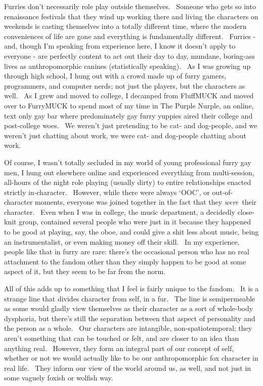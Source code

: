 Furries don't necessarily role play outside themselves. ~Someone who
gets so into renaissance festivals that they wind up working there and
living the characters on weekends is casting themselves into a totally
different time, where the modern conveniences of life are gone and
everything is fundamentally different. ~Furries - and, though I'm
speaking from experience here, I know it doesn't apply to everyone - are
perfectly content to act out their day to day, mundane, boring-ass lives
as anthropomorphic canines (statistically speaking). ~As I was growing
up through high school, I hung out with a crowd made up of furry gamers,
programmers, and computer nerds; not just the players, but the
characters as well. ~As I grew and moved to college, I decamped from
FluffMUCK and moved over to FurryMUCK to spend most of my time in The
Purple Nurple, an online, text only gay bar where predominately gay
furry yuppies aired their college and post-college woes. ~We weren't
just pretending to be cat- and dog-people, and we weren't just chatting
about work, we were cat- and dog-people chatting about work.

Of course, I wasn't totally secluded in my world of young professional
furry gay men, I hung out elsewhere online and experienced everything
from multi-session, all-hours of the night role playing (usually dirty)
to entire relationships enacted strictly in-character. ~However, while
there were always `OOC', or out-of-character moments, everyone was
joined together in the fact that they \emph{were}~their character. ~Even
when I was in college, the music department, a decidedly close-knit
group, contained several people who were just in it because they
happened to be good at playing, say, the oboe, and could give a shit
less about music, being an instrumentalist, or even making money off
their skill. ~In my experience, people like that in furry are rare:
there's the occasional person who has no real attachment to the fandom
other than they simply happen to be good at some aspect of it, but they
seem to be far from the norm.

All of this adds up to something that I feel is fairly unique to the
fandom. ~It is a strange line that divides character from self, in a
fur. ~The line is semipermeable as some would gladly view themselves as
their character as a sort of whole-body dysphoria, but there's still the
separation between that aspect of personality and the person as a whole.
~Our characters are intangible, non-spatiotemporal; they aren't
something that can be touched or felt, and are closer to an idea than
anything real. ~However, they form an integral part of our concept of
self, whether or not we would actually like to be our anthropomorphic
fox character in real life. ~They inform our view of the world around
us, as well, and not just in some vaguely foxish or wolfish way.

